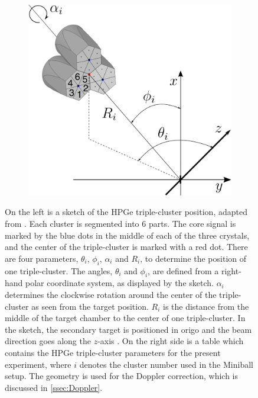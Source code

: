 \documentclass[twoside,english]{uiofysmaster/uiofysmaster}
\let\orgautoref\autoref
\renewcommand{\autoref}
        {%
		 \def\sectionautorefname{Section}%
		 \def\subsectionautorefname{Section}%
		 \def\subsubsectionautorefname{Section}%
		 \def\chapterautorefname{Chapter}%
          \orgautoref}
\begin{document}
\begin{figure}[ht]
	\centering
	\begin{subfigure}[b]{0.49\textwidth}
		\centering
		\includegraphics[width=\textwidth]{Images/HPGe2.png}
	\end{subfigure}
	\hfill
	\begin{subfigure}[b]{0.49\textwidth}
		\centering
    		 \newline %
	\end{subfigure}
	\caption{On the left is a sketch of the HPGe triple-cluster position, adapted from \cite{Rosiak}. 
	Each cluster is segmented into 6 parts. 
	The core signal is marked by the blue dots in the middle of each of the three crystals, and the center of the triple-cluster is marked with a red dot. 
	There are four parameters, $\theta_i$, $\phi_i$, $\alpha_i$ and $R_i$, to determine the position of one triple-cluster.
	The angles, $\theta_i$ and $\phi_i$, are defined from a right-hand polar coordinate system, as displayed by the sketch.
	$\alpha_i$ determines the clockwise rotation around the center of the triple-cluster as seen from the target position.
	$R_i$ is the distance from the middle of the target chamber to the center of one triple-cluster.
	In the sketch, the secondary target is positioned in origo and the beam direction goes along the $z$-axis \cite{NWarr-Angles, Rosiak}. 
	On the right side is a table which contains the HPGe triple-cluster parameters for the present experiment, where $i$ denotes the cluster number used in the Miniball setup. 
	The geometry is used for the Doppler correction, which is discussed in \autoref{ssec:Doppler}.}
	\label{fig:HPGe}
\end{figure}
\end{document}
